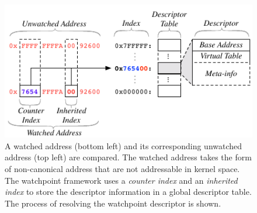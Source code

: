 

\begin{figure}[t]
\begin{center}
\includegraphics[width=6.0in]{watchpoints.pdf}
\end{center}
\vspace{-15pt}
\caption[Design of behavioral watchpoints.]{\label{fig:watchpoint_descriptor_table}A watched address (bottom left) and its corresponding unwatched address (top left) are compared. The watched address takes the form of non-canonical address that are not addressable in kernel space. The watchpoint framework uses a \emph{counter index} and an \emph{inherited index} to store the descriptor information in a global descriptor table. The process of resolving the watchpoint descriptor is shown.}
\end{figure}


